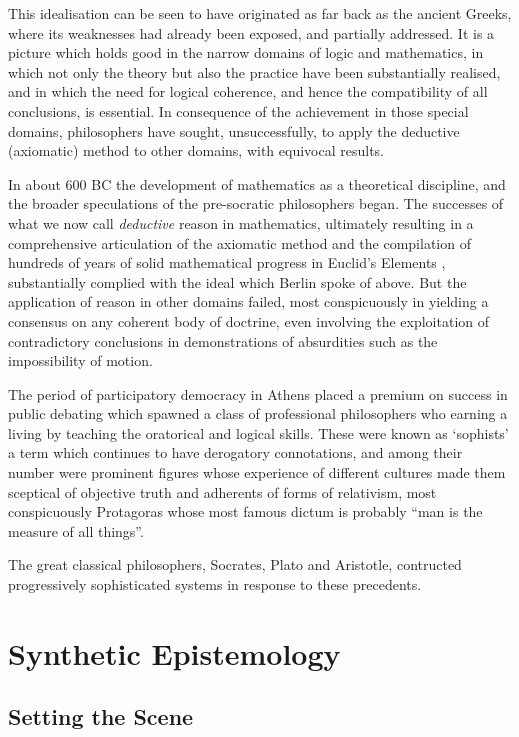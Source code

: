\documentclass[10pt,titlepage]{book}
\begin{document}
 
 This idealisation can be seen to have originated as far back as the ancient Greeks, where its weaknesses had already been exposed, and partially addressed.
It is a picture which holds good in the narrow domains of logic and mathematics, in which not only the theory but also the practice have been substantially realised, and in which the need for logical coherence, and hence the compatibility of all conclusions, is essential. 
In consequence of the achievement in those special domains,  philosophers have sought, unsuccessfully, to apply the deductive (axiomatic) method to other domains, with equivocal results.

In about 600 BC the development of mathematics as a theoretical discipline, and the broader speculations of the pre-socratic philosophers began.
The successes of what we now call \emph{deductive} reason in mathematics, ultimately resulting in a comprehensive articulation of the axiomatic method and the compilation of hundreds of years of solid mathematical progress in Euclid's Elements \cite{euclidEL1}, substantially complied with the ideal which Berlin spoke of above.
But the application of reason in other domains failed, most conspicuously in yielding a consensus on any coherent body of doctrine, even involving the exploitation of contradictory conclusions in demonstrations of absurdities such as the impossibility of motion.

The period of participatory democracy in Athens placed a premium on success in public debating which spawned a class of professional philosophers who earning a living by teaching the oratorical and logical skills.
These were known as `sophists' a term which continues to have derogatory connotations, and among their number were prominent figures whose experience of different cultures made them sceptical of objective truth and adherents of forms of relativism, most conspicuously Protagoras whose most famous dictum is probably ``man is the measure of all things''.

The great classical philosophers, Socrates, Plato and Aristotle, contructed progressively sophisticated systems in response to these precedents.

\part{Synthetic Epistemology}

\chapter{Setting the Scene}
\end{document}

